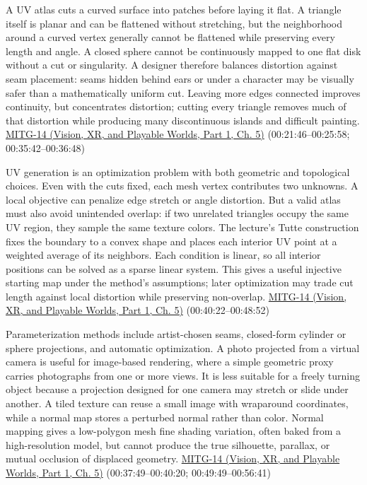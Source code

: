 A UV atlas cuts a curved surface into patches before laying it flat. A triangle itself is planar and can be flattened without stretching, but the neighborhood around a curved vertex generally cannot be flattened while preserving every length and angle. A closed sphere cannot be continuously mapped to one flat disk without a cut or singularity. A designer therefore balances distortion against seam placement: seams hidden behind ears or under a character may be visually safer than a mathematically uniform cut. Leaving more edges connected improves continuity, but concentrates distortion; cutting every triangle removes much of that distortion while producing many discontinuous islands and difficult painting. \href{../07-Vision-XR-and-Playable-Worlds-P01/main.pdf\#nameddest=04-visual-computing-ii-ch036-mitg-14---texture-mapping}{MITG-14 (Vision, XR, and Playable Worlds, Part 1, Ch. 5)} (00:21:46--00:25:58; 00:35:42--00:36:48)

UV generation is an optimization problem with both geometric and topological choices. Even with the cuts fixed, each mesh vertex contributes two unknowns. A local objective can penalize edge stretch or angle distortion. But a valid atlas must also avoid unintended overlap: if two unrelated triangles occupy the same UV region, they sample the same texture colors. The lecture's Tutte construction fixes the boundary to a convex shape and places each interior UV point at a weighted average of its neighbors. Each condition is linear, so all interior positions can be solved as a sparse linear system. This gives a useful injective starting map under the method's assumptions; later optimization may trade cut length against local distortion while preserving non-overlap. \href{../07-Vision-XR-and-Playable-Worlds-P01/main.pdf\#nameddest=04-visual-computing-ii-ch036-mitg-14---texture-mapping}{MITG-14 (Vision, XR, and Playable Worlds, Part 1, Ch. 5)} (00:40:22--00:48:52)

Parameterization methods include artist-chosen seams, closed-form cylinder or sphere projections, and automatic optimization. A photo projected from a virtual camera is useful for image-based rendering, where a simple geometric proxy carries photographs from one or more views. It is less suitable for a freely turning object because a projection designed for one camera may stretch or slide under another. A tiled texture can reuse a small image with wraparound coordinates, while a normal map stores a perturbed normal rather than color. Normal mapping gives a low-polygon mesh fine shading variation, often baked from a high-resolution model, but cannot produce the true silhouette, parallax, or mutual occlusion of displaced geometry. \href{../07-Vision-XR-and-Playable-Worlds-P01/main.pdf\#nameddest=04-visual-computing-ii-ch036-mitg-14---texture-mapping}{MITG-14 (Vision, XR, and Playable Worlds, Part 1, Ch. 5)} (00:37:49--00:40:20; 00:49:49--00:56:41)

